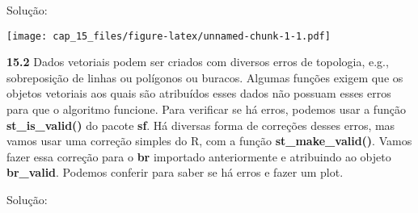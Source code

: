 \documentclass[
]{book}
\newenvironment{Shaded}{\begin{snugshade}}{\end{snugshade}}
\newcommand{\AttributeTok}[1]{\textcolor[rgb]{0.77,0.63,0.00}{#1}}
\newcommand{\CommentTok}[1]{\textcolor[rgb]{0.56,0.35,0.01}{\textit{#1}}}
\newcommand{\ConstantTok}[1]{\textcolor[rgb]{0.00,0.00,0.00}{#1}}
\newcommand{\FunctionTok}[1]{\textcolor[rgb]{0.00,0.00,0.00}{#1}}
\newcommand{\NormalTok}[1]{#1}
\newcommand{\OtherTok}[1]{\textcolor[rgb]{0.56,0.35,0.01}{#1}}
\newcommand{\SpecialCharTok}[1]{\textcolor[rgb]{0.00,0.00,0.00}{#1}}
\newcommand{\StringTok}[1]{\textcolor[rgb]{0.31,0.60,0.02}{#1}}
\begin{document}
Solução:

\begin{Shaded}
\end{Shaded}

\texttt{[image: cap\_15\_files/figure-latex/unnamed-chunk-1-1.pdf]}

\textbf{15.2}
Dados vetoriais podem ser criados com diversos erros de topologia, e.g., sobreposição de linhas ou polígonos ou buracos. Algumas funções exigem que os objetos vetoriais aos quais são atribuídos esses dados não possuam esses erros para que o algoritmo funcione. Para verificar se há erros, podemos usar a função \textbf{st\_is\_valid()} do pacote \textbf{sf}. Há diversas forma de correções desses erros, mas vamos usar uma correção simples do R, com a função \textbf{st\_make\_valid()}. Vamos fazer essa correção para o \textbf{br} importado anteriormente e atribuindo ao objeto \textbf{br\_valid}. Podemos conferir para saber se há erros e fazer um plot.

Solução:

\begin{Shaded}
\end{Shaded}
\end{document}
